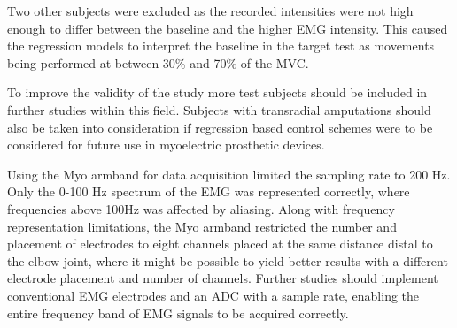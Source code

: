 Two other subjects were excluded as the recorded intensities were not high enough to differ between the baseline and the higher EMG intensity. This caused the regression models to interpret the baseline in the target test as movements being performed at between 30\% and 70\% of the MVC. 

To improve the validity of the study more test subjects should be included in further studies within this field. Subjects with transradial amputations should also be taken into consideration if regression based control schemes were to be considered for future use in myoelectric prosthetic devices. 

Using the Myo armband for data acquisition limited the sampling rate to 200 Hz. Only the 0-100 Hz spectrum of the EMG was represented correctly, where frequencies above 100Hz was affected by aliasing. Along with frequency representation limitations, the Myo armband restricted the number and placement of electrodes to eight channels placed at the same distance distal to the elbow joint, where it might be possible to yield better results with a different electrode placement and number of channels. Further studies should implement conventional EMG electrodes and an ADC with a sample rate, enabling the entire frequency band of EMG signals to be acquired correctly.



